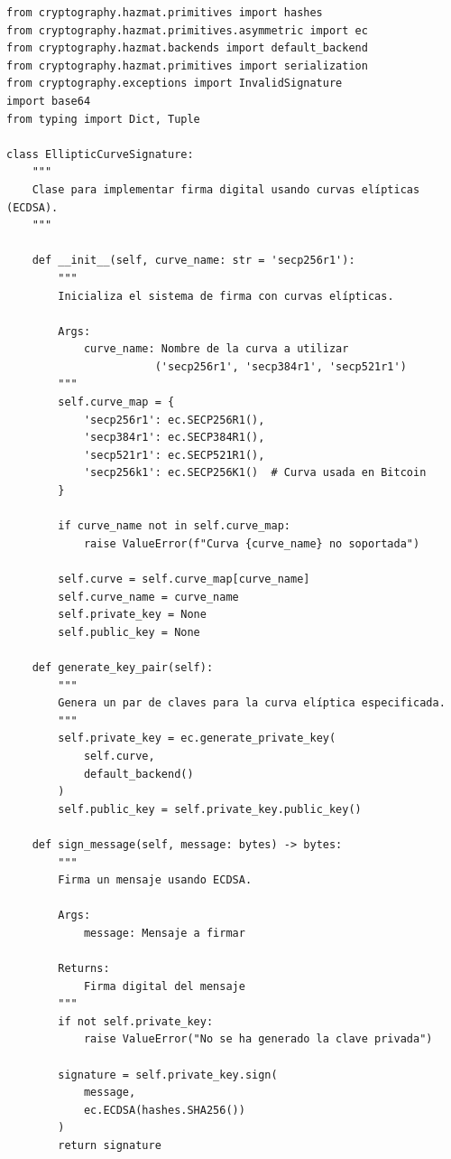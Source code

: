 \documentclass[12pt,a4paper]{article}
\begin{document}
\begin{lstlisting}[caption=Implementación de firma digital con curvas elípticas]
from cryptography.hazmat.primitives import hashes
from cryptography.hazmat.primitives.asymmetric import ec
from cryptography.hazmat.backends import default_backend
from cryptography.hazmat.primitives import serialization
from cryptography.exceptions import InvalidSignature
import base64
from typing import Dict, Tuple

class EllipticCurveSignature:
    """
    Clase para implementar firma digital usando curvas elípticas (ECDSA).
    """
    
    def __init__(self, curve_name: str = 'secp256r1'):
        """
        Inicializa el sistema de firma con curvas elípticas.
        
        Args:
            curve_name: Nombre de la curva a utilizar
                       ('secp256r1', 'secp384r1', 'secp521r1')
        """
        self.curve_map = {
            'secp256r1': ec.SECP256R1(),
            'secp384r1': ec.SECP384R1(),
            'secp521r1': ec.SECP521R1(),
            'secp256k1': ec.SECP256K1()  # Curva usada en Bitcoin
        }
        
        if curve_name not in self.curve_map:
            raise ValueError(f"Curva {curve_name} no soportada")
            
        self.curve = self.curve_map[curve_name]
        self.curve_name = curve_name
        self.private_key = None
        self.public_key = None
        
    def generate_key_pair(self):
        """
        Genera un par de claves para la curva elíptica especificada.
        """
        self.private_key = ec.generate_private_key(
            self.curve,
            default_backend()
        )
        self.public_key = self.private_key.public_key()
        
    def sign_message(self, message: bytes) -> bytes:
        """
        Firma un mensaje usando ECDSA.
        
        Args:
            message: Mensaje a firmar
            
        Returns:
            Firma digital del mensaje
        """
        if not self.private_key:
            raise ValueError("No se ha generado la clave privada")
            
        signature = self.private_key.sign(
            message,
            ec.ECDSA(hashes.SHA256())
        )
        return signature
    

\end{lstlisting}
\end{document}

